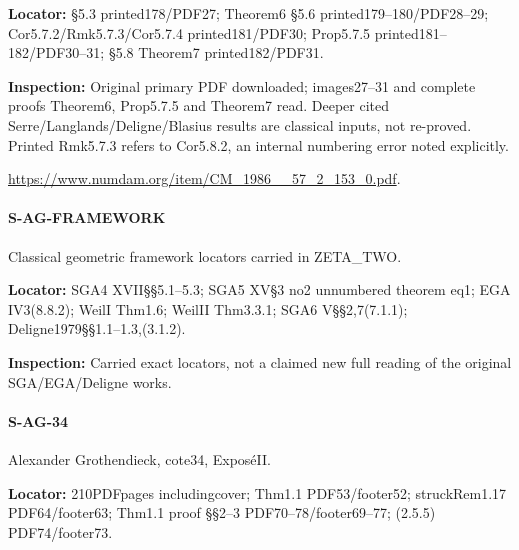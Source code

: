 \documentclass[11pt,a4paper]{article}
\begin{document}
\textbf{Locator:} §5.\allowbreak{}3 printed178/\allowbreak{}PDF27; Theorem6 §5.\allowbreak{}6 printed179–\allowbreak{}180/\allowbreak{}PDF28–\allowbreak{}29; Cor5.\allowbreak{}7.\allowbreak{}2/\allowbreak{}Rmk5.\allowbreak{}7.\allowbreak{}3/\allowbreak{}Cor5.\allowbreak{}7.\allowbreak{}4 printed181/\allowbreak{}PDF30; Prop5.\allowbreak{}7.\allowbreak{}5 printed181–\allowbreak{}182/\allowbreak{}PDF30–\allowbreak{}31; §5.\allowbreak{}8 Theorem7 printed182/\allowbreak{}PDF31.

\textbf{Inspection:} Original primary PDF downloaded; images27–\allowbreak{}31 and complete proofs Theorem6, Prop5.\allowbreak{}7.\allowbreak{}5 and Theorem7 read.\allowbreak{} Deeper cited Serre/\allowbreak{}Langlands/\allowbreak{}Deligne/\allowbreak{}Blasius results are classical inputs, not re-proved.\allowbreak{} Printed Rmk5.\allowbreak{}7.\allowbreak{}3 refers to Cor5.\allowbreak{}8.\allowbreak{}2, an internal numbering error noted explicitly.\allowbreak{}

\url{https://www.numdam.org/item/CM_1986__57_2_153_0.pdf}.

\paragraph{S-AG-FRAMEWORK} Classical geometric framework locators carried in ZETA\_\allowbreak{}TWO.

\textbf{Locator:} SGA4 XVII§§5.\allowbreak{}1–\allowbreak{}5.\allowbreak{}3; SGA5 XV§3 no2 unnumbered theorem eq1; EGA IV3(8.\allowbreak{}8.\allowbreak{}2); WeilI Thm1.\allowbreak{}6; WeilII Thm3.\allowbreak{}3.\allowbreak{}1; SGA6 V§§2,7(7.\allowbreak{}1.\allowbreak{}1); Deligne1979§§1.\allowbreak{}1–\allowbreak{}1.\allowbreak{}3,(3.\allowbreak{}1.\allowbreak{}2).

\textbf{Inspection:} Carried exact locators, not a claimed new full reading of the original SGA/\allowbreak{}EGA/\allowbreak{}Deligne works.\allowbreak{}


\paragraph{S-AG-34} Alexander Grothendieck, cote34, ExposéII.

\textbf{Locator:} 210PDFpages includingcover; Thm1.\allowbreak{}1 PDF53/\allowbreak{}footer52; struckRem1.\allowbreak{}17 PDF64/\allowbreak{}footer63; Thm1.\allowbreak{}1 proof §§2–\allowbreak{}3 PDF70–\allowbreak{}78/\allowbreak{}footer69–\allowbreak{}77; (2.\allowbreak{}5.\allowbreak{}5) PDF74/\allowbreak{}footer73.
\end{document}
